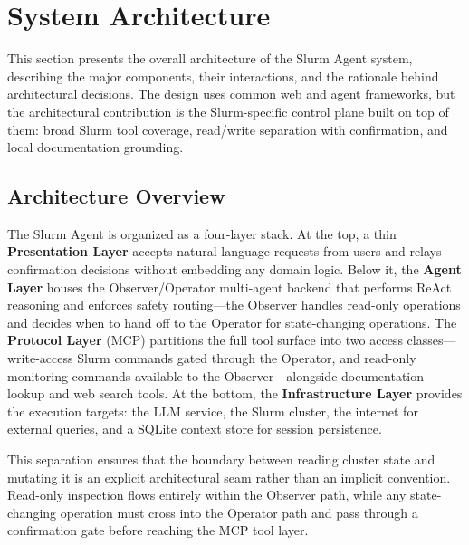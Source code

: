 \section{System Architecture}
\label{sec:architecture}

This section presents the overall architecture of the Slurm Agent system, describing the major components, their interactions, and the rationale behind architectural decisions. The design uses common web and agent frameworks, but the architectural contribution is the Slurm-specific control plane built on top of them: broad Slurm tool coverage, read/write separation with confirmation, and local documentation grounding.

\subsection{Architecture Overview}

The Slurm Agent is organized as a four-layer stack. At the top, a thin \textbf{Presentation Layer} accepts natural-language requests from users and relays confirmation decisions without embedding any domain logic. Below it, the \textbf{Agent Layer} houses the Observer/Operator multi-agent backend that performs ReAct reasoning and enforces safety routing---the Observer handles read-only operations and decides when to hand off to the Operator for state-changing operations. The \textbf{Protocol Layer} (MCP) partitions the full tool surface into two access classes---write-access Slurm commands gated through the Operator, and read-only monitoring commands available to the Observer---alongside documentation lookup and web search tools. At the bottom, the \textbf{Infrastructure Layer} provides the execution targets: the LLM service, the Slurm cluster, the internet for external queries, and a SQLite context store for session persistence.

This separation ensures that the boundary between reading cluster state and mutating it is an explicit architectural seam rather than an implicit convention. Read-only inspection flows entirely within the Observer path, while any state-changing operation must cross into the Operator path and pass through a confirmation gate before reaching the MCP tool layer.

